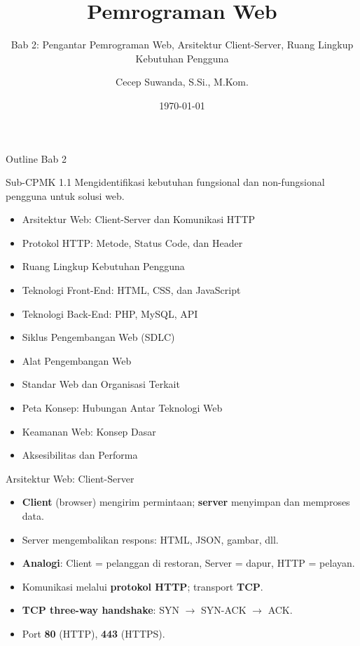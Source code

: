 \documentclass[handout]{beamer}
\title[Bab 2 -- Pengantar Web]{Pemrograman Web}
\subtitle{Bab 2: Pengantar Pemrograman Web, Arsitektur Client-Server, Ruang Lingkup Kebutuhan Pengguna}
\author{Cecep Suwanda, S.Si., M.Kom.}
\institute{Universitas Bale Bandung}
\date{\today}
\begin{document}
\begin{frame}
	\titlepage
\end{frame}

\begin{frame}[shrink=15]{Outline Bab 2}
	\begin{block}{Sub-CPMK 1.1}
		Mengidentifikasi kebutuhan fungsional dan non-fungsional pengguna untuk solusi web.
	\end{block}
	\begin{itemize}
		\item Arsitektur Web: Client-Server dan Komunikasi HTTP
		\item Protokol HTTP: Metode, Status Code, dan Header
		\item Ruang Lingkup Kebutuhan Pengguna
		\item Teknologi Front-End: HTML, CSS, dan JavaScript
		\item Teknologi Back-End: PHP, MySQL, API
		\item Siklus Pengembangan Web (SDLC)
		\item Alat Pengembangan Web
		\item Standar Web dan Organisasi Terkait
		\item Peta Konsep: Hubungan Antar Teknologi Web
		\item Keamanan Web: Konsep Dasar
		\item Aksesibilitas dan Performa
	\end{itemize}
\end{frame}

\begin{frame}{Arsitektur Web: Client-Server}
	\begin{itemize}
		\item \textbf{Client} (browser) mengirim permintaan; \textbf{server} menyimpan dan memproses data.
		\item Server mengembalikan respons: HTML, JSON, gambar, dll.
		\item \textbf{Analogi}: Client = pelanggan di restoran, Server = dapur, HTTP = pelayan.
		\item Komunikasi melalui \textbf{protokol HTTP}; transport \textbf{TCP}.
		\item \textbf{TCP three-way handshake}: SYN $\to$ SYN-ACK $\to$ ACK.
		\item Port \textbf{80} (HTTP), \textbf{443} (HTTPS).
	\end{itemize}
\end{frame}
\end{document}
